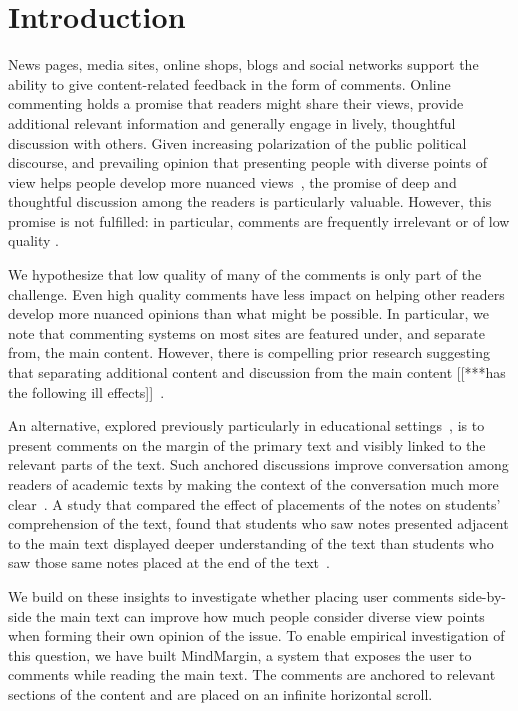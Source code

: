 \section{Introduction}

News pages, media sites, online shops, blogs and social networks support the ability to give content-related feedback in the form of comments. Online commenting holds a promise that readers might share their views, provide additional relevant information and generally engage in lively, thoughtful discussion with others. Given increasing polarization of the public political discourse, and prevailing opinion that presenting people with diverse points of view helps people develop more nuanced views~\cite{ConsiderIt,Politics,NewsCube}, 
the promise of deep and thoughtful discussion among the readers is particularly valuable.  However, this promise is not fulfilled: in particular, comments are frequently irrelevant or of low quality \cite{CommentQuality, FlamingCommunications}.

We hypothesize that low quality of many of the comments is only part of the challenge.  Even high quality comments have less impact on helping other readers develop more nuanced opinions than what might be possible.  In particular, we note that commenting systems on most sites are featured under, and separate from, the main content.  However, there is compelling prior research suggesting that separating additional content and discussion from the main content [[***has the following ill effects]]~\cite{Brush,Guzdial,van,AnnotationsStudents,NewsInterfaces,FluidDocs,NB}.

An alternative, explored previously particularly in educational settings~\cite{Brush,Guzdial,van,AnnotationsStudents}, is to present comments on the margin of the primary text and visibly linked to the relevant parts of the text.  Such anchored discussions improve conversation among readers of academic texts by making the context of the conversation much more clear~\cite{Brush,Guzdial,van}.  A study that compared the effect of placements of the notes on students' comprehension of the text, found that students who saw notes presented adjacent to the main text displayed deeper understanding of the text than students who saw those same notes placed at the end of the text~\cite{AnnotationsStudents}.

We build on these insights to investigate whether placing user comments side-by-side the main text can improve how much people consider diverse view points when forming their own opinion of the issue.  To enable empirical investigation of this question, we have built MindMargin, a system that exposes the user to comments while reading the main text. The comments are anchored to relevant sections of the content and are placed on an infinite horizontal scroll.

